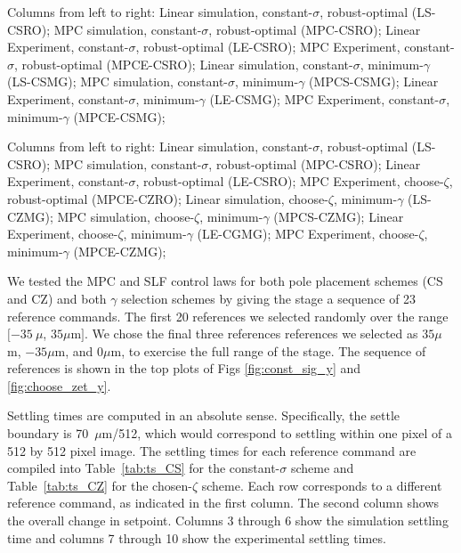 \documentclass[journal,twocolumn,twoside]{IEEEtran}
\begin{document}
\begin{table*}
  \begin{minipage}{1\textwidth}
  \caption{Columns from left to right: Linear simulation, constant-$\sigma$, robust-optimal (LS-CSRO); MPC simulation, constant-$\sigma$, robust-optimal (MPC-CSRO); Linear Experiment, constant-$\sigma$, robust-optimal (LE-CSRO);
    MPC Experiment, constant-$\sigma$, robust-optimal (MPCE-CSRO);
    Linear simulation, constant-$\sigma$, minimum-$\gamma$ (LS-CSMG);
    MPC simulation, constant-$\sigma$, minimum-$\gamma$ (MPCS-CSMG);
    Linear Experiment, constant-$\sigma$, minimum-$\gamma$ (LE-CSMG);
    MPC Experiment, constant-$\sigma$, minimum-$\gamma$ (MPCE-CSMG);
  }
   
   \label{tab:ts_CS}
 \end{minipage}
 \begin{minipage}{1\textwidth}
     \caption{Columns from left to right: Linear simulation, constant-$\sigma$, robust-optimal (LS-CSRO); MPC simulation, constant-$\sigma$, robust-optimal (MPC-CSRO); Linear Experiment, constant-$\sigma$, robust-optimal (LE-CSRO);
    MPC Experiment, choose-$\zeta$, robust-optimal (MPCE-CZRO);
    Linear simulation, choose-$\zeta$, minimum-$\gamma$ (LS-CZMG);
    MPC simulation, choose-$\zeta$, minimum-$\gamma$ (MPCS-CZMG);
    Linear Experiment, choose-$\zeta$, minimum-$\gamma$ (LE-CGMG);
    MPC Experiment, choose-$\zeta$, minimum-$\gamma$ (MPCE-CZMG);
  }
   
   \label{tab:ts_CZ}
 \end{minipage}
   \begin{centering}
    
  \end{centering}
\end{table*}
We tested the MPC and SLF control laws for both pole placement schemes (CS and CZ) and both $\gamma$ selection schemes by giving the stage a sequence of 23 reference commands. The first 20 references we selected randomly over the range $[-35~\mu$, $35\mu\text{m}]$. We chose the final three references references we selected as $35\mu$m, $-35\mu$m, and $0\mu$m, to exercise the full range of the stage. The sequence of references is shown in the top plots of Figs \ref{fig:const_sig_y} and \ref{fig:choose_zet_y}.

Settling times are computed in an absolute sense. Specifically, the settle boundary is 70~$\mu$m/512, which would correspond to settling within one pixel of a 512 by 512 pixel image.
The settling times for each reference command are compiled into Table~\ref{tab:ts_CS} for the constant-$\sigma$ scheme and Table~\ref{tab:ts_CZ} for the chosen-$\zeta$ scheme. Each row corresponds to a different reference command, as indicated in the first column. The second column shows the overall change in setpoint. Columns 3 through 6 show the simulation settling time and columns 7 through 10 show the experimental settling times.
\end{document}
